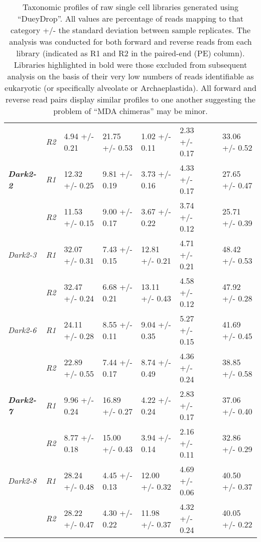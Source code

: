 \begin{table}[h!]
{\begin{tabular}{|l||l|l|l|l|l|l|l|}
                              & \textit{R2}                   & 4.94 +/- 0.21      & 21.75 +/- 0.53    & 1.02 +/- 0.11      & 2.33 +/- 0.17          &  & 33.06 +/- 0.52      \\
         \textbf{\textit{Dark2-2}}     & \textit{R1}          & 12.32 +/- 0.25     & 9.81 +/- 0.19     & 3.73 +/- 0.16      & 4.33 +/- 0.17          &  & 27.65 +/- 0.47      \\ 
                              & \textit{R2}                   & 11.53 +/- 0.15     & 9.00 +/- 0.17     & 3.67 +/- 0.22      & 3.74 +/- 0.12          &  & 25.71 +/- 0.39      \\
         \textit{Dark2-3}     & \textit{R1}                   & 32.07 +/- 0.31     & 7.43 +/- 0.15     & 12.81 +/- 0.21     & 4.71 +/- 0.21          &  & 48.42 +/- 0.53      \\ 
                              & \textit{R2}                   & 32.47 +/- 0.24     & 6.68 +/- 0.21     & 13.11 +/- 0.43     & 4.58 +/- 0.12          &  & 47.92 +/- 0.28      \\
         \textit{Dark2-6}     & \textit{R1}                   & 24.11 +/- 0.28     & 8.55 +/- 0.11     & 9.04 +/- 0.35      & 5.27 +/- 0.15          &  & 41.69 +/- 0.45      \\ 
                              & \textit{R2}                   & 22.89 +/- 0.55     & 7.44 +/- 0.17     & 8.74 +/- 0.49      & 4.36 +/- 0.24          &  & 38.85 +/- 0.58      \\
         \textbf{\textit{Dark2-7}}     & \textit{R1}          & 9.96 +/- 0.24      & 16.89 +/- 0.27    & 4.22 +/- 0.24      & 2.83 +/- 0.17          &  & 37.06 +/- 0.40      \\ 
                              & \textit{R2}                   & 8.77 +/- 0.18      & 15.00 +/- 0.43    & 3.94 +/- 0.14      & 2.16 +/- 0.11          &  & 32.86 +/- 0.29      \\
         \textit{Dark2-8}     & \textit{R1}                   & 28.24 +/- 0.48     & 4.45 +/- 0.13     & 12.00 +/- 0.32     & 4.69 +/- 0.06          &  & 40.50 +/- 0.37      \\ 
                              & \textit{R2}                   & 28.22 +/- 0.47     & 4.30 +/- 0.22     & 11.98 +/- 0.37     & 4.32 +/- 0.24          &  & 40.05 +/- 0.22      \\
         \hline
 \end{tabular}}
     \caption[DueyDrop taxonomic profile summary]{Taxonomic profiles of raw single cell libraries generated using ``DueyDrop''. All values are percentage of reads mapping to that category +/- the standard deviation between sample replicates.  
         The analysis was conducted for both forward and reverse reads from each library (indicated as R1 and R2 in the paired-end (PE) column).
         Libraries highlighted in bold were those excluded from subsequent analysis on the basis of their very low numbers of reads identifiable as 
 eukaryotic (or specifically alveolate or Archaeplastida). All forward and reverse read pairs display similar profiles to one another suggesting
 the problem of ``MDA chimeras'' may be minor.}
 \label{tab:sct_duey}
\end{table}

